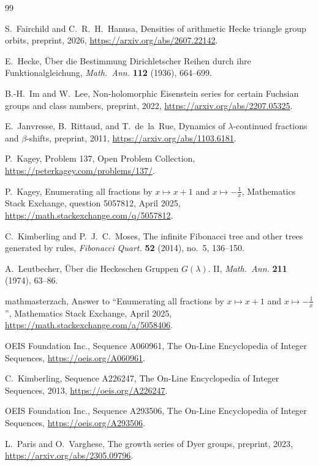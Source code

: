\begin{thebibliography}{99}\small\setlength{\itemsep}{1pt}

S.~Fairchild and C.~R.~H.~Hanusa, Densities of arithmetic Hecke triangle group orbits, preprint,
2026, \url{https://arxiv.org/abs/2607.22142}.

E.~Hecke, \"Uber die Bestimmung Dirichletscher Reihen durch ihre Funktionalgleichung,
\emph{Math.\ Ann.} \textbf{112} (1936), 664--699.

B.-H.~Im and W.~Lee, Non-holomorphic Eisenstein series for certain Fuchsian groups and class numbers,
preprint, 2022, \url{https://arxiv.org/abs/2207.05325}.

E.~Janvresse, B.~Rittaud, and T.~de~la~Rue, Dynamics of $\lambda$-continued fractions and
$\beta$-shifts, preprint, 2011, \url{https://arxiv.org/abs/1103.6181}.

P.~Kagey, Problem 137, Open Problem Collection, \url{https://peterkagey.com/problems/137/}.

P.~Kagey, Enumerating all fractions by $x\mapsto x+1$ and $x\mapsto-\frac1x$, Mathematics Stack
Exchange, question 5057812, April 2025, \url{https://math.stackexchange.com/q/5057812}.

C.~Kimberling and P.~J.~C.~Moses, The infinite Fibonacci tree and other trees generated by rules,
\emph{Fibonacci Quart.} \textbf{52} (2014), no.~5, 136--150.

A.~Leutbecher, \"Uber die Heckeschen Gruppen $G(\lambda)$. II, \emph{Math.\ Ann.} \textbf{211}
(1974), 63--86.

mathmasterzach, Answer to ``Enumerating all fractions by $x\mapsto x+1$ and $x\mapsto-\frac1x$'',
Mathematics Stack Exchange, April 2025, \url{https://math.stackexchange.com/a/5058406}.

OEIS Foundation Inc., Sequence A060961, The On-Line Encyclopedia of Integer Sequences,
\url{https://oeis.org/A060961}.

C.~Kimberling, Sequence A226247, The On-Line Encyclopedia of Integer Sequences, 2013,
\url{https://oeis.org/A226247}.

OEIS Foundation Inc., Sequence A293506, The On-Line Encyclopedia of Integer Sequences,
\url{https://oeis.org/A293506}.

L.~Paris and O.~Varghese, The growth series of Dyer groups, preprint, 2023,
\url{https://arxiv.org/abs/2305.09796}.


\end{thebibliography}
